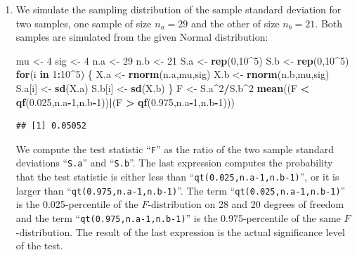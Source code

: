\documentclass[]{krantz}
\makeatletter
\newenvironment{Shaded}{\begin{snugshade}}{\end{snugshade}}
\newcommand{\KeywordTok}[1]{\textcolor[rgb]{0.13,0.29,0.53}{\textbf{#1}}}
\newcommand{\DecValTok}[1]{\textcolor[rgb]{0.00,0.00,0.81}{#1}}
\newcommand{\FloatTok}[1]{\textcolor[rgb]{0.00,0.00,0.81}{#1}}
\newcommand{\StringTok}[1]{\textcolor[rgb]{0.31,0.60,0.02}{#1}}
\newcommand{\ControlFlowTok}[1]{\textcolor[rgb]{0.13,0.29,0.53}{\textbf{#1}}}
\newcommand{\OperatorTok}[1]{\textcolor[rgb]{0.81,0.36,0.00}{\textbf{#1}}}
\newcommand{\NormalTok}[1]{#1}
\newenvironment{kframe}{%
\medskip{}
\setlength{\fboxsep}{.8em}
 \def\at@end@of@kframe{}%
 \ifinner\ifhmode%
  \def\at@end@of@kframe{\end{minipage}}%
  \begin{minipage}{\columnwidth}%
 \fi\fi%
 \def\FrameCommand##1{\hskip\@totalleftmargin \hskip-\fboxsep
 \colorbox{shadecolor}{##1}\hskip-\fboxsep
     \hskip-\linewidth \hskip-\@totalleftmargin \hskip\columnwidth}%
 \MakeFramed {\advance\hsize-\width
   \@totalleftmargin\z@ \linewidth\hsize
   \@setminipage}}%
 {\par\unskip\endMakeFramed%
 \at@end@of@kframe}
\renewenvironment{Shaded}{\begin{kframe}}{\end{kframe}}
\theoremstyle{definition}
\theoremstyle{definition}
\theoremstyle{definition}
\theoremstyle{remark}
\makeatother
\begin{document}
\begin{enumerate}
\def\labelenumi{\arabic{enumi}.}
\item
  We simulate the sampling distribution of the sample standard deviation
  for two samples, one sample of size \(n_a = 29\) and the other of size
  \(n_b=21\). Both samples are simulated from the given Normal
  distribution:

\begin{Shaded}
\begin{Highlighting}[]
\NormalTok{mu <-}\StringTok{ }\DecValTok{4}
\NormalTok{sig <-}\StringTok{ }\DecValTok{4}
\NormalTok{n.a <-}\StringTok{ }\DecValTok{29}
\NormalTok{n.b <-}\StringTok{ }\DecValTok{21}
\NormalTok{S.a <-}\StringTok{ }\KeywordTok{rep}\NormalTok{(}\DecValTok{0}\NormalTok{,}\DecValTok{10}\OperatorTok{^}\DecValTok{5}\NormalTok{)}
\NormalTok{S.b <-}\StringTok{ }\KeywordTok{rep}\NormalTok{(}\DecValTok{0}\NormalTok{,}\DecValTok{10}\OperatorTok{^}\DecValTok{5}\NormalTok{)}
\ControlFlowTok{for}\NormalTok{(i }\ControlFlowTok{in} \DecValTok{1}\OperatorTok{:}\DecValTok{10}\OperatorTok{^}\DecValTok{5}\NormalTok{) \{}
\NormalTok{  X.a <-}\StringTok{ }\KeywordTok{rnorm}\NormalTok{(n.a,mu,sig)}
\NormalTok{  X.b <-}\StringTok{ }\KeywordTok{rnorm}\NormalTok{(n.b,mu,sig)}
\NormalTok{  S.a[i] <-}\StringTok{ }\KeywordTok{sd}\NormalTok{(X.a)}
\NormalTok{  S.b[i] <-}\StringTok{ }\KeywordTok{sd}\NormalTok{(X.b)}
\NormalTok{\}}
\NormalTok{F <-}\StringTok{ }\NormalTok{S.a}\OperatorTok{^}\DecValTok{2}\OperatorTok{/}\NormalTok{S.b}\OperatorTok{^}\DecValTok{2}
\KeywordTok{mean}\NormalTok{((F }\OperatorTok{<}\StringTok{ }\KeywordTok{qf}\NormalTok{(}\FloatTok{0.025}\NormalTok{,n.a}\OperatorTok{-}\DecValTok{1}\NormalTok{,n.b}\OperatorTok{-}\DecValTok{1}\NormalTok{))}\OperatorTok{|}\NormalTok{(F }\OperatorTok{>}\StringTok{ }\KeywordTok{qf}\NormalTok{(}\FloatTok{0.975}\NormalTok{,n.a}\OperatorTok{-}\DecValTok{1}\NormalTok{,n.b}\OperatorTok{-}\DecValTok{1}\NormalTok{)))}
\end{Highlighting}
\end{Shaded}

\begin{verbatim}
## [1] 0.05052
\end{verbatim}

  We compute the test statistic ``\texttt{F}'' as the ratio of the two
  sample standard deviations ``\texttt{S.a}'' and ``\texttt{S.b}''. The
  last expression computes the probability that the test statistic is
  either less than ``\texttt{qt(0.025,n.a-1,n.b-1)}'', or it is larger
  than ``\texttt{qt(0.975,n.a-1,n.b-1)}''. The term
  ``\texttt{qt(0.025,n.a-1,n.b-1)}'' is the 0.025-percentile of the
  \(F\)-distribution on 28 and 20 degrees of freedom and the term
  ``\texttt{qt(0.975,n.a-1,n.b-1)}'' is the 0.975-percentile of the same
  \(F\)-distribution. The result of the last expression is the actual
  significance level of the test.


\end{enumerate}
\end{document}
